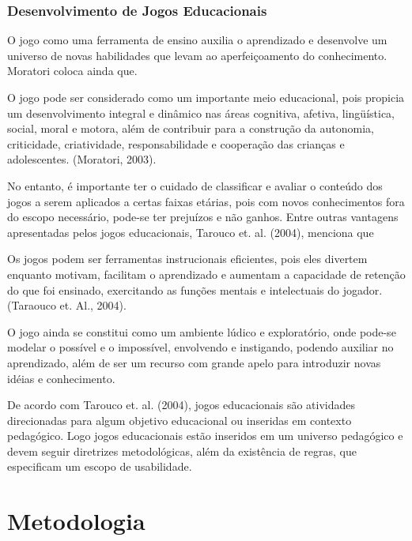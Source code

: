 \subsection{Desenvolvimento de Jogos Educacionais}
	
O jogo como uma ferramenta de ensino auxilia o aprendizado e desenvolve um universo de novas habilidades que levam ao aperfeiçoamento do conhecimento. Moratori coloca ainda que.

\begin{citacao}
O jogo pode ser considerado como um importante meio educacional, pois propicia um desenvolvimento integral e dinâmico nas áreas cognitiva, afetiva, lingüística, social, moral e motora, além de contribuir para a construção da autonomia, criticidade, criatividade, responsabilidade e cooperação das crianças e adolescentes. (Moratori, 2003).
\end{citacao}

No entanto, é importante ter o cuidado de classificar e avaliar o conteúdo dos jogos a serem aplicados a certas faixas etárias, pois com novos conhecimentos fora do escopo necessário, pode-se ter prejuízos e não ganhos. Entre outras vantagens apresentadas pelos jogos educacionais, Tarouco et. al. (2004), menciona que

\begin{citacao}
Os jogos podem ser ferramentas instrucionais eficientes, pois eles divertem enquanto motivam, facilitam o aprendizado e aumentam a capacidade de retenção do que foi ensinado, exercitando as funções mentais e intelectuais do jogador. (Taraouco et. Al., 2004).
\end{citacao}

O jogo ainda se constitui como um ambiente lúdico e exploratório, onde pode-se modelar o possível e o impossível, envolvendo e instigando, podendo auxiliar no aprendizado, além de ser um recurso com grande apelo para introduzir novas idéias e conhecimento.

De acordo com Tarouco et. al. (2004), jogos educacionais são atividades direcionadas para algum objetivo educacional ou inseridas em contexto pedagógico. Logo jogos educacionais estão inseridos em um universo pedagógico e devem seguir diretrizes metodológicas, além da existência de regras, que especificam um escopo de usabilidade.


\chapter{Metodologia}

